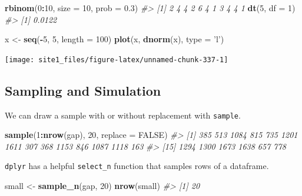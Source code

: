 \documentclass[]{book}
\newenvironment{Shaded}{\begin{snugshade}}{\end{snugshade}}
\newcommand{\KeywordTok}[1]{\textcolor[rgb]{0.13,0.29,0.53}{\textbf{#1}}}
\newcommand{\DataTypeTok}[1]{\textcolor[rgb]{0.13,0.29,0.53}{#1}}
\newcommand{\DecValTok}[1]{\textcolor[rgb]{0.00,0.00,0.81}{#1}}
\newcommand{\FloatTok}[1]{\textcolor[rgb]{0.00,0.00,0.81}{#1}}
\newcommand{\StringTok}[1]{\textcolor[rgb]{0.31,0.60,0.02}{#1}}
\newcommand{\CommentTok}[1]{\textcolor[rgb]{0.56,0.35,0.01}{\textit{#1}}}
\newcommand{\OtherTok}[1]{\textcolor[rgb]{0.56,0.35,0.01}{#1}}
\newcommand{\OperatorTok}[1]{\textcolor[rgb]{0.81,0.36,0.00}{\textbf{#1}}}
\newcommand{\NormalTok}[1]{#1}
\begin{document}
\begin{Shaded}
\begin{Highlighting}[]
\KeywordTok{rbinom}\NormalTok{(}\DecValTok{0}\OperatorTok{:}\DecValTok{10}\NormalTok{, }\DataTypeTok{size =} \DecValTok{10}\NormalTok{, }\DataTypeTok{prob =} \FloatTok{0.3}\NormalTok{)}
\CommentTok{#>  [1] 2 4 4 2 6 4 1 3 4 4 1}
\KeywordTok{dt}\NormalTok{(}\DecValTok{5}\NormalTok{, }\DataTypeTok{df =} \DecValTok{1}\NormalTok{)}
\CommentTok{#> [1] 0.0122}

\NormalTok{x <-}\StringTok{ }\KeywordTok{seq}\NormalTok{(}\OperatorTok{-}\DecValTok{5}\NormalTok{, }\DecValTok{5}\NormalTok{, }\DataTypeTok{length =} \DecValTok{100}\NormalTok{)}
\KeywordTok{plot}\NormalTok{(x, }\KeywordTok{dnorm}\NormalTok{(x), }\DataTypeTok{type =} \StringTok{'l'}\NormalTok{)}
\end{Highlighting}
\end{Shaded}

\begin{center}\texttt{[image: site1\_files/figure-latex/unnamed-chunk-337-1]} \end{center}

\subsection{Sampling and Simulation}\label{sampling-and-simulation}

We can draw a sample with or without replacement with \texttt{sample}.

\begin{Shaded}
\begin{Highlighting}[]
\KeywordTok{sample}\NormalTok{(}\DecValTok{1}\OperatorTok{:}\KeywordTok{nrow}\NormalTok{(gap), }\DecValTok{20}\NormalTok{, }\DataTypeTok{replace =} \OtherTok{FALSE}\NormalTok{)}
\CommentTok{#>  [1]  385  513 1084  815  735 1201 1611  307  368 1153  846 1087 1118  163}
\CommentTok{#> [15] 1294 1300 1673 1638  657  778}
\end{Highlighting}
\end{Shaded}

\texttt{dplyr} has a helpful \texttt{select\_n} function that samples
rows of a dataframe.

\begin{Shaded}
\begin{Highlighting}[]
\NormalTok{small <-}\StringTok{ }\KeywordTok{sample_n}\NormalTok{(gap, }\DecValTok{20}\NormalTok{)}
\KeywordTok{nrow}\NormalTok{(small)}
\CommentTok{#> [1] 20}
\end{Highlighting}
\end{Shaded}
\end{document}
